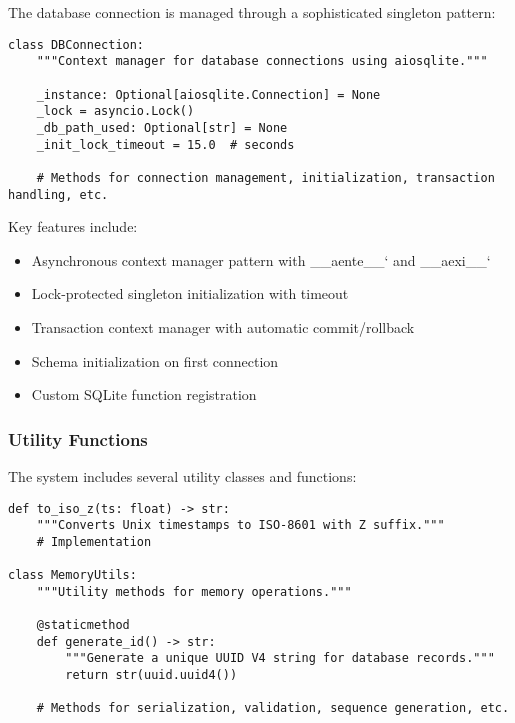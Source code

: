 \documentclass[12pt,a4paper]{article}
\begin{document}
The database connection is managed through a sophisticated singleton pattern:

\begin{pageablecode}
\begin{verbatim}
class DBConnection:
    """Context manager for database connections using aiosqlite."""

    _instance: Optional[aiosqlite.Connection] = None
    _lock = asyncio.Lock()
    _db_path_used: Optional[str] = None
    _init_lock_timeout = 15.0  # seconds

    # Methods for connection management, initialization, transaction handling, etc.
\end{verbatim}
\end{pageablecode}

Key features include:
\begin{itemize}
    \item Asynchronous context manager pattern with \1\__aente\1\__` and \1\__aexi\1\__`
    \item Lock-protected singleton initialization with timeout
    \item Transaction context manager with automatic commit/rollback
    \item Schema initialization on first connection
    \item Custom SQLite function registration
\end{itemize}

\subsubsection*{Utility Functions}

The system includes several utility classes and functions:

\begin{pageablecode}
\begin{verbatim}
def to_iso_z(ts: float) -> str:
    """Converts Unix timestamps to ISO-8601 with Z suffix."""
    # Implementation

class MemoryUtils:
    """Utility methods for memory operations."""

    @staticmethod
    def generate_id() -> str:
        """Generate a unique UUID V4 string for database records."""
        return str(uuid.uuid4())

    # Methods for serialization, validation, sequence generation, etc.
\end{verbatim}
\end{pageablecode}
\end{document}
